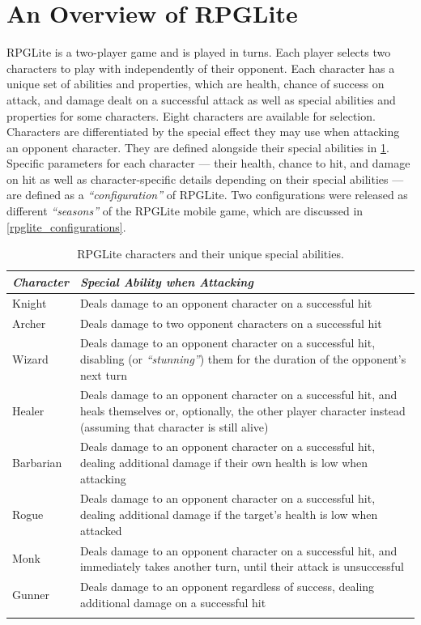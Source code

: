 \section{An Overview of RPGLite}
\label{sec:rpglite_overview}

RPGLite is a two-player game and is played in turns. Each player selects two
characters to play with independently of their opponent. Each character has a
unique set of abilities and properties, which are health, chance of success on
attack, and damage dealt on a successful attack as well as special abilities and
properties for some characters. Eight characters are available for selection.
Characters are differentiated by the special effect they may use when attacking
an opponent character. They are defined alongside their special abilities in
\cref{fig:chars_and_their_abilities}. Specific parameters for each character ---
their health, chance to hit, and damage on hit as well as character-specific
details depending on their special abilities --- are defined as a
\emph{``configuration''} of RPGLite. Two configurations were released as
different \emph{``seasons''} of the RPGLite mobile game, which are discussed in
\cref{rpglite_configurations}.

\begin{table}
  \centering
\begin{tabular}{@{}lp{}@{}}
  \toprule{}
  \emph{Character} & \emph{Special Ability when Attacking}\\
  \midrule{}
  Knight & Deals damage to an opponent character on a successful
  hit \tabularnewline{} 
  \rule{0pt}{2em}Archer & Deals damage to two opponent
  characters on a successful hit \tabularnewline{} 
  \rule{0pt}{2em}Wizard &
  Deals damage to an opponent character on a successful hit, disabling (or
  \emph{``stunning''}) them for the duration of the opponent's next
  turn\tabularnewline{} 
  \rule{0pt}{2em}Healer & Deals damage to an opponent
  character on a successful hit, and heals themselves or, optionally, the other
  player character instead (assuming that character is still
  alive)\tabularnewline{} 
  \rule{0pt}{2em}Barbarian & Deals damage to an opponent
  character on a successful hit, dealing additional damage if their own health
  is low when attacking\tabularnewline{} 
  \rule{0pt}{2em}Rogue & Deals damage to
  an opponent character on a successful hit, dealing additional damage if the
  target's health is low when attacked\tabularnewline{} 
  \rule{0pt}{2em}Monk &
  Deals damage to an opponent character on a successful hit, and immediately
  takes another turn, until their attack is unsuccessful\tabularnewline{}
  \rule{0pt}{2em}Gunner & Deals damage to an opponent regardless of success,
  dealing additional damage on a successful hit\\
\bottomrule{}
\end{tabular}
\caption{RPGLite characters and their unique special abilities.}
\label{fig:chars_and_their_abilities}
\end{table}

